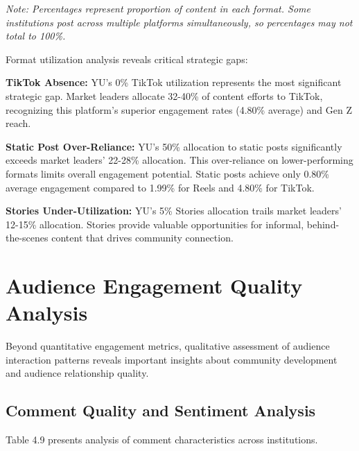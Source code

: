 \documentclass[12pt]{report}
\begin{document}
\textit{Note: Percentages represent proportion of content in each format. Some institutions post across multiple platforms simultaneously, so percentages may not total to 100\%.}

Format utilization analysis reveals critical strategic gaps:

\textbf{TikTok Absence:} YU's 0\% TikTok utilization represents the most significant strategic gap. Market leaders allocate 32-40\% of content efforts to TikTok, recognizing this platform's superior engagement rates (4.80\% average) and Gen Z reach.

\textbf{Static Post Over-Reliance:} YU's 50\% allocation to static posts significantly exceeds market leaders' 22-28\% allocation. This over-reliance on lower-performing formats limits overall engagement potential. Static posts achieve only 0.80\% average engagement compared to 1.99\% for Reels and 4.80\% for TikTok.

\textbf{Stories Under-Utilization:} YU's 5\% Stories allocation trails market leaders' 12-15\% allocation. Stories provide valuable opportunities for informal, behind-the-scenes content that drives community connection.

\chapter{Audience Engagement Quality Analysis}

Beyond quantitative engagement metrics, qualitative assessment of audience interaction patterns reveals important insights about community development and audience relationship quality.

\section{Comment Quality and Sentiment Analysis}

Table 4.9 presents analysis of comment characteristics across institutions.
\end{document}
